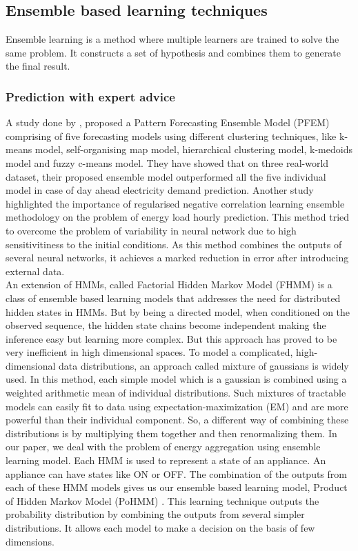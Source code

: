 \documentclass[conference]{IEEEtran}
\begin{document}
\subsection{Ensemble based learning techniques}
Ensemble learning is a method where multiple learners are trained to solve the same problem. It constructs a set of hypothesis and combines them to generate the final result.
\subsubsection{Prediction with expert advice}
A study done by \cite{Shen}, proposed a Pattern Forecasting Ensemble Model (PFEM) comprising of five forecasting models using different clustering techniques, like k-means model, self-organising map model, hierarchical clustering model, k-medoids model and fuzzy c-means model. They have showed that on three real-world dataset, their proposed ensemble model outperformed all the five individual model in case of day ahead electricity demand prediction.
Another study \cite{Felice} highlighted the importance of regularised negative correlation learning ensemble methodology on the problem of energy load hourly prediction. This method tried to overcome the problem of variability in neural network due to high sensitivitiness to the initial conditions. As this method combines the outputs of several neural networks, it achieves a marked reduction in error after introducing external data. \\
An extension of HMMs, called Factorial Hidden Markov Model (FHMM) \cite{fhmm} is a class of ensemble based learning models that addresses the need for distributed hidden states in HMMs. But by being a directed model, when conditioned on the observed sequence, the hidden state chains become independent making the inference easy but learning more complex. But this approach has proved to be very inefficient in high dimensional spaces.
To model a complicated, high-dimensional data distributions, an approach called mixture of gaussians is widely used. In this method, each simple model which is a gaussian is combined using a weighted arithmetic mean of individual distributions. Such mixtures of tractable models can easily fit to data using expectation-maximization (EM) and are more powerful than their individual component. So, a different way of combining these distributions is by multiplying them together and then renormalizing them.
In our paper,  we deal with the problem of energy aggregation using ensemble learning model. Each HMM is used to represent a state of an appliance. An appliance can have states like ON or OFF. The combination of the outputs from each of these HMM models gives us our ensemble based learning model, Product of Hidden Markov Model (PoHMM) \cite{hinton2000}. This learning technique outputs the probability distribution by combining the outputs from several simpler distributions. It allows each model to make a decision on the basis of few dimensions.
\end{document}
